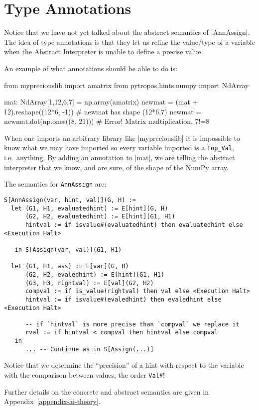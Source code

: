 \section{Type Annotations}

Notice that we have not yet talked about the abstract semantics of \pycode|AnnAssign|.
The idea of type annotations is that they let us refine the value/type of a variable when
the Abstract Interpreter is unable to define a precise value.

An example of what annotations should be able to do is:

\begin{pythoncode}
from mypreciouslib import amatrix
from pytropos.hints.numpy import NdArray

mat: NdArray[1,12,6,7] = np.array(amatrix)
newmat = (mat + 12).reshape((12*6, -1))  # newmat has shape (12*6,7)
newmat = newmat.dot(np.ones((8, 21)))  # Error! Matrix multiplication, 7!=8
\end{pythoncode}

When one imports an arbitrary library like \pycode|mypreciouslib| it is
impossible to know what we may have imported so every variable imported
is a \verb|Top_Val|, i.e.~anything. By adding an annotation to
\pycode|mat|, we are telling the abstract interpreter that we know, and
are sure, of the shape of the NumPy array.

The semantics for \texttt{AnnAssign} are:

\begin{verbatim}
S[AnnAssign(var, hint, val)](G, H) :=
  let (G1, H1, evaluatedhint) := E[hint](G, H)
      (G2, H2, evaluatedhint) := E[hint](G1, H1)
      hintval := if isvalue#(evaluatedhint) then evaluatedhint else <Execution Halt>

   in S[Assign(var, val)](G1, H1)

  let (G1, H1, ass) := E[var](G, H)
      (G2, H2, evaledhint) := E[hint](G1, H1)
      (G3, H3, rightval) := E[val](G2, H2)
      compval := if is_value(rightval) then val else <Execution Halt>
      hintval := if isvalue#(evaledhint) then evaledhint else <Execution Halt>

      -- if `hintval` is more precise than `compval` we replace it
      rval := if hintval < compval then hintval else compval
   in
      ... -- Continue as in S[Assign(...)]
\end{verbatim}

Notice that we determine the \enquote{precision} of a hint with respect to the variable
with the comparison between values, the order \verb|Val#|!

Further details on the concrete and abstract semantics are given in Appendix~\ref{appendix-ai-theory}.
